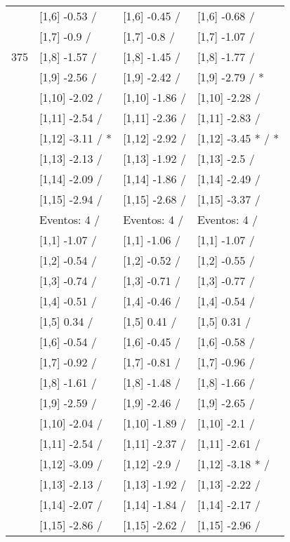\begin{table}
\begin{tabular}[t]{llll}
 & {}[1,6] -0.53  / & {}[1,6] -0.45  / & {}[1,6] -0.68  /\\
 & {}[1,7] -0.9  / & {}[1,7] -0.8  / & {}[1,7] -1.07  /\\
375 & {}[1,8] -1.57  / & {}[1,8] -1.45  / & {}[1,8] -1.77  /\\
\addlinespace
 & {}[1,9] -2.56  / & {}[1,9] -2.42  / & {}[1,9] -2.79  / *\\
 & {}[1,10] -2.02  / & {}[1,10] -1.86  / & {}[1,10] -2.28  /\\
 & {}[1,11] -2.54  / & {}[1,11] -2.36  / & {}[1,11] -2.83  /\\
 & {}[1,12] -3.11  / * & {}[1,12] -2.92  / & {}[1,12] -3.45 * / *\\
 & {}[1,13] -2.13  / & {}[1,13] -1.92  / & {}[1,13] -2.5  /\\
\addlinespace
 & {}[1,14] -2.09  / & {}[1,14] -1.86  / & {}[1,14] -2.49  /\\
 & {}[1,15] -2.94  / & {}[1,15] -2.68  / & {}[1,15] -3.37  /\\
 & Eventos:  4 / & Eventos:  4 / & Eventos:  4 /\\
 & {}[1,1] -1.07  / & {}[1,1] -1.06  / & {}[1,1] -1.07  /\\
 & {}[1,2] -0.54  / & {}[1,2] -0.52  / & {}[1,2] -0.55  /\\
\addlinespace
 & {}[1,3] -0.74  / & {}[1,3] -0.71  / & {}[1,3] -0.77  /\\
 & {}[1,4] -0.51  / & {}[1,4] -0.46  / & {}[1,4] -0.54  /\\
 & {}[1,5] 0.34  / & {}[1,5] 0.41  / & {}[1,5] 0.31  /\\
 & {}[1,6] -0.54  / & {}[1,6] -0.45  / & {}[1,6] -0.58  /\\
 & {}[1,7] -0.92  / & {}[1,7] -0.81  / & {}[1,7] -0.96  /\\
\addlinespace
500 & {}[1,8] -1.61  / & {}[1,8] -1.48  / & {}[1,8] -1.66  /\\
 & {}[1,9] -2.59  / & {}[1,9] -2.46  / & {}[1,9] -2.65  /\\
 & {}[1,10] -2.04  / & {}[1,10] -1.89  / & {}[1,10] -2.1  /\\
 & {}[1,11] -2.54  / & {}[1,11] -2.37  / & {}[1,11] -2.61  /\\
 & {}[1,12] -3.09  / & {}[1,12] -2.9  / & {}[1,12] -3.18 * /\\
\addlinespace
 & {}[1,13] -2.13  / & {}[1,13] -1.92  / & {}[1,13] -2.22  /\\
 & {}[1,14] -2.07  / & {}[1,14] -1.84  / & {}[1,14] -2.17  /\\
 & {}[1,15] -2.86  / & {}[1,15] -2.62  / & {}[1,15] -2.96  /\\
\bottomrule
\end{tabular}
\end{table}
